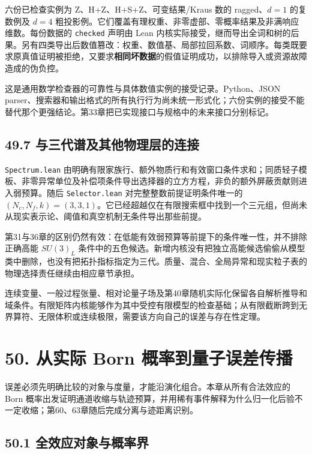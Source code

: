 \documentclass[
  11pt,
  oneside]{book}
\begin{document}
六份已检查实例为 Z、H+Z、H+S+Z、可变结果/Kraus 数的 ragged、\(d=1\)
的复数例及 \(d=4\)
粗投影例。它们覆盖有理权重、非零虚部、零概率结果及非满响应维数。每份数据的
\texttt{checked} 声明由 Lean
内核实际接受，继而导出全词和树的后果。另有四类导出后数值篡改：权重、数值基、局部拉回系数、词顺序。每类既要求原真值证明被拒绝，又要求\textbf{相同坏数据}的假值证明成功，以排除导入或资源故障造成的伪负控。

这是通用数学检查器的可靠性与具体数值实例的接受记录。Python、JSON
parser、搜索器和输出格式的所有执行行为尚未统一形式化；六份实例的接受不能替代那个更强结论。第33章把已实现接口与规格中的未来接口分别标记。

\section{49.7 与三代谱及其他物理层的连接}

\texttt{Spectrum.\allowbreak lean}
由明确有限家族行、额外物质行和有效窗口条件求和；同质轻子模板、非零异常单位及补偿项条件导出选择器的立方方程，非负的额外屏蔽贡献则进入弱预算。随后
\texttt{Selector.\allowbreak lean} 对完整整数前提证明条件唯一的
\((N_c,N_f,k)=(3,3,1)\)。它已经超越仅在有限搜索框中找到一个三元组，但尚未从现实表示论、阈值和真空机制无条件导出那些前提。

第31与36章的区别仍然有效：在低能有效弱预算等前提下的条件唯一性，并不排除正确高能
\(SU(3)_L\)
条件中的五色候选。新增内核没有把独立高能候选偷偷从模型类中删除，也没有把拓扑指标指定为三代。质量、混合、全局异常和现实粒子表的物理选择责任继续由相应章节承担。

连续变量、一般过程张量、相对论量子场及第40章随机实际化保留各自解析推导和域条件。有限矩阵内核能够作为其中受控有限模型的检查基础；从有限截断跨到无界算符、无限体积或连续极限，需要该方向自己的误差与存在性定理。

\chapter{50. 从实际 Born 概率到量子误差传播}\label{ch-50}\hypertarget{ch-50}{}

误差必须先明确比较的对象与度量，才能沿演化组合。本章从所有合法效应的
Born
概率出发证明通道收缩与轨迹预算，并用稀有事件解释为什么归一化后验不一定收缩；第60、63章随后完成分离与迹距离识别。

\section{50.1 全效应对象与概率界}
\end{document}
